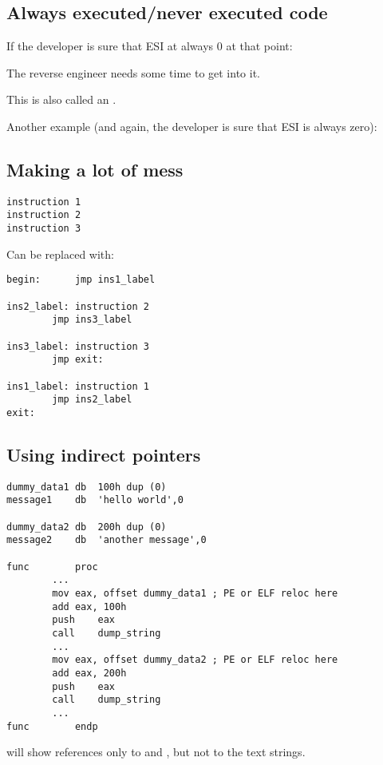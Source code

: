 \subsection{Always executed/never executed code}

If the developer is sure that ESI 
at always 0 at that point:



The reverse engineer needs some time to get into it.

This is also called an .

Another example (and again, the developer is sure that ESI is always zero):



\subsection{Making a lot of mess}

\begin{lstlisting}
instruction 1
instruction 2
instruction 3
\end{lstlisting}

Can be replaced with:

\begin{lstlisting}
begin:		jmp	ins1_label

ins2_label:	instruction 2
		jmp	ins3_label

ins3_label:	instruction 3
		jmp	exit:

ins1_label:	instruction 1
		jmp	ins2_label
exit:
\end{lstlisting}

\subsection{Using indirect pointers}

\begin{lstlisting}
dummy_data1	db	100h dup (0)
message1	db	'hello world',0

dummy_data2	db	200h dup (0)
message2	db	'another message',0

func		proc
		...
		mov	eax, offset dummy_data1 ; PE or ELF reloc here
		add	eax, 100h
		push	eax
		call	dump_string
		...
		mov	eax, offset dummy_data2 ; PE or ELF reloc here
		add	eax, 200h
		push	eax
		call	dump_string
		...
func		endp
\end{lstlisting}

\IDA{} will show references only to  and , 
but not to the text strings.

